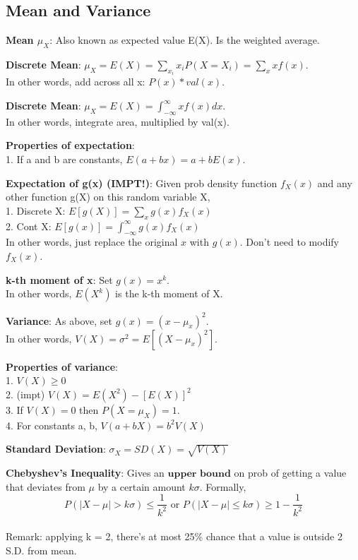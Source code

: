 \documentclass[a4paper,landscape]{article}
\newcommand{\rntopic}[1]{\vspace{-2.0em}\subsection*{#1}\vspace{-1.0em}}
\newcommand{\rnname}[1]{\textbf{#1}}
\begin{document}
\begin{multicols*}{4}
\rntopic{Mean and Variance}
\vspace{0.3cm}
\begin{flatitemize}
\item \rnname{Mean $\mu_{X}$}: Also known as expected value E(X). Is the weighted average.
\item \rnname{Discrete Mean}: $\mu_{X} = E(X) = \sum_{x_i} x_i P(X = X_i) = \sum_{x} x f(x)$. \\
In other words, add across all x: $P(x) * val(x)$.
\item \rnname{Discrete Mean}: $\mu_{X} = E(X) = \int_{-\infty}^{\infty} xf(x) dx$. \\
In other words, integrate area, multiplied by val(x).
\item \rnname{Properties of expectation}: \\
1. If a and b are constants, $E(a+bx) = a + bE(x)$. \\
\item \rnname{Expectation of g(x) (IMPT!)}: Given prob density function $f_X(x)$ and any other function g(X) on this random variable X, \\
1. Discrete X: $E[g(X)] = \sum_{x}g(x) f_X(x)$ \\
2. Cont X: $E[g(x)] = \int_{-\infty}^{\infty} g(x) f_X(x)$ \\
In other words, just replace the original $x$ with $g(x)$. Don't need to modify $f_X(x)$.
\item \rnname{k-th moment of x}: Set $g(x) = x^k$.\\ 
In other words, $E(X^k)$ is the k-th moment of X.
\item \rnname{Variance}: As above, set $g(x) = (x-\mu_{x})^2$. \\
In other words, $V(X) = \sigma ^2 = E[(X-\mu_{x})^2]$. 
\item \rnname{Properties of variance}: \\
1. $V(X) \geq 0$ \\
2. (impt) $V(X) = E(X^2) - [E(X)]^2$ \\
3. If $V(X) = 0$ then $P(X = \mu_X) = 1$.\\
4. For constants a, b, $V(a+bX) = b^2V(X)$
\item \rnname{Standard Deviation}: $\sigma_X = SD(X) = \sqrt{V(X)}$
\item \rnname{Chebyshev’s Inequality}: Gives an $\textbf{upper bound}$ on prob of getting a value that deviates from $\mu$ by a certain amount $k\sigma$. Formally, \\
$$P(|X-\mu|>k\sigma)\leq \frac{1}{k^2} \text{ or } P(|X-\mu| \leq k\sigma) \geq 1 - \frac{1}{k^2}$$ \\
Remark: applying k = 2, there's at most 25\% chance that a value is outside 2 S.D. from mean.
\end{flatitemize}


\end{multicols*}
\end{document}
